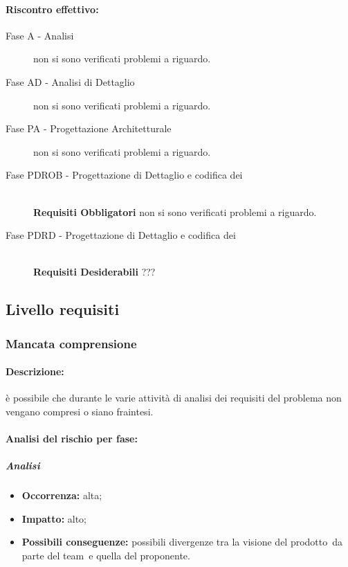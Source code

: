 \documentclass[../PianoProgetto.tex]{subfiles}
\begin{document}
	
	\paragraph*{Riscontro effettivo:}
		\begin{description}
			\item[Fase A - Analisi] non si sono verificati problemi a riguardo.
			\item[Fase AD - Analisi di Dettaglio] non si sono verificati problemi a riguardo.
			\item[Fase PA - Progettazione Architetturale] non si sono verificati problemi a riguardo.
			\item[Fase PDROB - Progettazione di Dettaglio e codifica dei]  \ \\
					\textbf{Requisiti Obbligatori} non si sono verificati problemi a riguardo.
			\item[Fase PDRD - Progettazione di Dettaglio e codifica dei] \ \\
					\textbf{Requisiti Desiderabili} ???
		\end{description}

\newpage
\subsection{Livello requisiti}

\subsubsection{Mancata comprensione}
\label{sec:Mancata comprensione}

	\paragraph*{Descrizione:} è possibile che durante le varie attività di analisi dei requisiti del problema non vengano compresi o siano fraintesi.
	
	\paragraph*{Analisi del rischio per fase:} 

		\subparagraph*{Analisi}
			\begin{itemize}[label={-}]
				\item \textbf{Occorrenza:} alta;
				\item \textbf{Impatto:} alto;
				\item \textbf{Possibili conseguenze:} possibili divergenze tra la visione del prodotto\g\ da parte del team\g\ e quella del proponente.
			\end{itemize}
			
\end{document}
